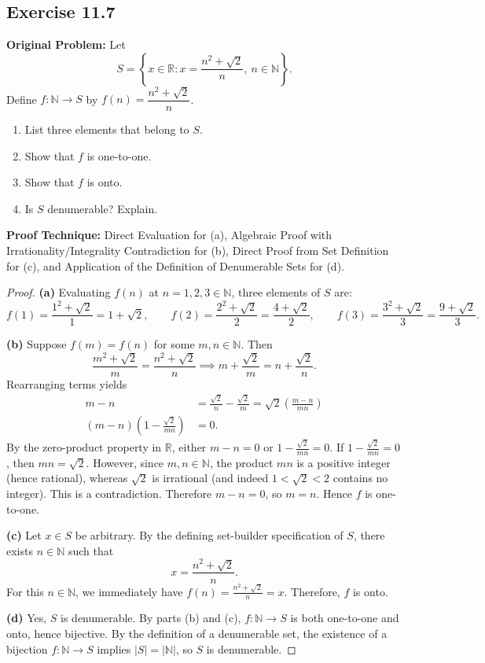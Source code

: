 \documentclass[11pt, letterpaper]{article}
\theoremstyle{definition}
\theoremstyle{remark}
\begin{document}
\subsection{Exercise 11.7}

\textbf{Original Problem:} Let
\[
S = \left\{ x \in \mathbb{R} : x = \frac{n^2 + \sqrt{2}}{n},\ n \in \mathbb{N} \right\}.
\]
Define $f : \mathbb{N} \to S$ by $f(n) = \dfrac{n^2 + \sqrt{2}}{n}$.
\begin{enumerate}[label=(\alph*)]
    \item List three elements that belong to $S$.
    \item Show that $f$ is one-to-one.
    \item Show that $f$ is onto.
    \item Is $S$ denumerable? Explain.
\end{enumerate}

\textbf{Proof Technique:} Direct Evaluation for (a), Algebraic Proof with Irrationality/Integrality Contradiction for (b), Direct Proof from Set Definition for (c), and Application of the Definition of Denumerable Sets for (d).

\begin{proof}
\textbf{(a)} Evaluating $f(n)$ at $n = 1, 2, 3 \in \mathbb{N}$, three elements of $S$ are:
\[
f(1) = \frac{1^2 + \sqrt{2}}{1} = 1 + \sqrt{2}, \qquad
f(2) = \frac{2^2 + \sqrt{2}}{2} = \frac{4 + \sqrt{2}}{2}, \qquad
f(3) = \frac{3^2 + \sqrt{2}}{3} = \frac{9 + \sqrt{2}}{3}.
\]

\textbf{(b)} Suppose $f(m) = f(n)$ for some $m, n \in \mathbb{N}$. Then
\[
\frac{m^2 + \sqrt{2}}{m} = \frac{n^2 + \sqrt{2}}{n} \implies m + \frac{\sqrt{2}}{m} = n + \frac{\sqrt{2}}{n}.
\]
Rearranging terms yields
\begin{align*}
m - n &= \frac{\sqrt{2}}{n} - \frac{\sqrt{2}}{m} = \sqrt{2}\left(\frac{m - n}{mn}\right) \\
(m - n)\left(1 - \frac{\sqrt{2}}{mn}\right) &= 0.
\end{align*}
By the zero-product property in $\mathbb{R}$, either $m - n = 0$ or $1 - \frac{\sqrt{2}}{mn} = 0$. If $1 - \frac{\sqrt{2}}{mn} = 0$, then $mn = \sqrt{2}$. However, since $m, n \in \mathbb{N}$, the product $mn$ is a positive integer (hence rational), whereas $\sqrt{2}$ is irrational (and indeed $1 < \sqrt{2} < 2$ contains no integer). This is a contradiction. Therefore $m - n = 0$, so $m = n$. Hence $f$ is one-to-one.

\textbf{(c)} Let $x \in S$ be arbitrary. By the defining set-builder specification of $S$, there exists $n \in \mathbb{N}$ such that
\[
x = \frac{n^2 + \sqrt{2}}{n}.
\]
For this $n \in \mathbb{N}$, we immediately have $f(n) = \frac{n^2 + \sqrt{2}}{n} = x$. Therefore, $f$ is onto.

\textbf{(d)} Yes, $S$ is denumerable. By parts (b) and (c), $f : \mathbb{N} \to S$ is both one-to-one and onto, hence bijective. By the definition of a denumerable set, the existence of a bijection $f : \mathbb{N} \to S$ implies $|S| = |\mathbb{N}|$, so $S$ is denumerable.
\end{proof}
\end{document}
